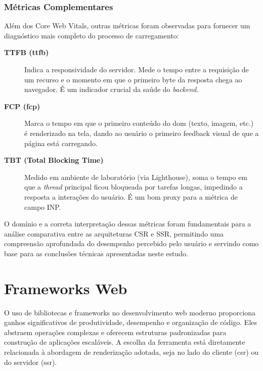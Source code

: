 \subsubsection{Métricas Complementares}
Além dos Core Web Vitals, outras métricas foram observadas para fornecer um diagnóstico mais completo do processo de carregamento:
\begin{description}
    \item[\textbf{TTFB (\acrfull{ttfb})}] Indica a responsividade do servidor. Mede o tempo entre a requisição de um recurso e o momento em que o primeiro byte da resposta chega ao navegador. É um indicador crucial da saúde do \textit{backend}.
    \item[\textbf{FCP (\acrfull{fcp})}] Marca o tempo em que o primeiro conteúdo do \acrshort{dom} (texto, imagem, etc.) é renderizado na tela, dando ao usuário o primeiro feedback visual de que a página está carregando.
    \item[\textbf{TBT (Total Blocking Time)}] Medido em ambiente de laboratório (via Lighthouse), soma o tempo em que a \textit{thread} principal ficou bloqueada por tarefas longas, impedindo a resposta a interações do usuário. É um bom proxy para a métrica de campo INP.
\end{description}
O domínio e a correta interpretação dessas métricas foram fundamentais para a análise comparativa entre as arquiteturas CSR e SSR, permitindo uma compreensão aprofundada do desempenho percebido pelo usuário e servindo como base para as conclusões técnicas apresentadas neste estudo.






























\section{Frameworks Web}
\label{sec:frameworks-web}

O uso de bibliotecas e frameworks no desenvolvimento web moderno proporciona ganhos significativos de produtividade, desempenho e organização de código. Eles abstraem operações complexas e oferecem estruturas padronizadas para construção de aplicações escaláveis. A escolha da ferramenta está diretamente relacionada à abordagem de renderização adotada, seja no lado do cliente (\acrshort{csr}) ou do servidor (\acrshort{ssr}).

